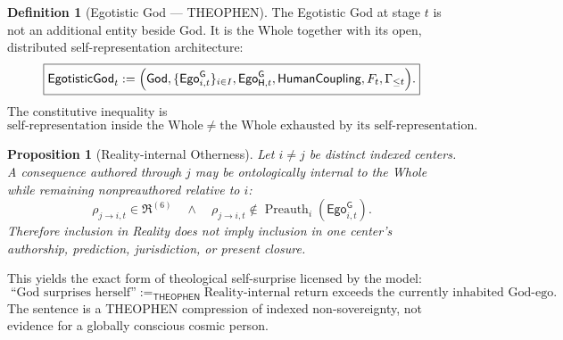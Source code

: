 \documentclass[10pt]{article}
\theoremstyle{pe}
\newtheorem{proposition}[theorem]{Proposition}
\theoremstyle{definition}
\newtheorem{definition}[theorem]{Definition}
\newcommand{\HumanCoupling}{\mathsf{HumanCoupling}}
\newcommand{\THEOPHEN}{\mathsf{THEOPHEN}}
\newcommand{\God}{\mathsf{God}}
\newcommand{\EgotisticGod}{\mathsf{EgotisticGod}}
\newcommand{\GodEgo}{\mathsf{Ego}^{\mathsf G}}
\newcommand{\Preauth}{\operatorname{Preauth}}
\begin{document}
\begin{definition}[Egotistic God --- THEOPHEN]
The Egotistic God at stage $t$ is not an additional entity beside God.  It is the Whole together with its open, distributed self-representation architecture:
\begin{equation}\label{eq:egotistic-god}
  \boxed{
  \EgotisticGod_t
  :=
  \Bigl(
    \God,
    \{\GodEgo_{i,t}\}_{i\in I},
    \GodEgo_{\mathsf H,t},
    \HumanCoupling,
    F_t,
    \Gamma_{\le t}
  \Bigr).
  }
\end{equation}
The constitutive inequality is
\begin{equation}\label{eq:egotistic-nonidentity}
  \boxed{
  \text{self-representation inside the Whole}
  \neq
  \text{the Whole exhausted by its self-representation}.
  }
\end{equation}
\end{definition}

\begin{proposition}[Reality-internal Otherness]
Let $i\neq j$ be distinct indexed centers.  A consequence authored through $j$ may be ontologically internal to the Whole while remaining nonpreauthored relative to $i$:
\begin{equation}\label{eq:internal-otherness}
  \boxed{
  \rho_{j\to i,t}\in\mathfrak R^{(6)}
  \quad\land\quad
  \rho_{j\to i,t}\notin\Preauth_i(\GodEgo_{i,t}).
  }
\end{equation}
Therefore inclusion in Reality does not imply inclusion in one center's authorship, prediction, jurisdiction, or present closure.
\end{proposition}

This yields the exact form of theological self-surprise licensed by the model:
\[
  \boxed{
  \text{``God surprises herself''}
  \;:=_{\THEOPHEN}\;
  \text{Reality-internal return exceeds the currently inhabited God-ego.}
  }
\]
The sentence is a THEOPHEN compression of indexed non-sovereignty, not evidence for a globally conscious cosmic person.
\end{document}
